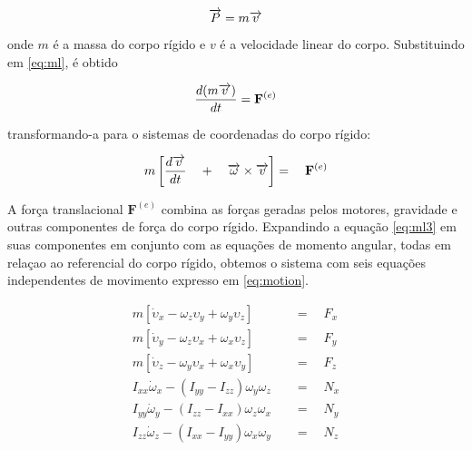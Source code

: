 \documentclass[a4paper, 12pt]{article}
\begin{document}
\begin{equation}
\centering
\overrightarrow { P } = m\overrightarrow { v } 
\label{eq:ml2}
\end{equation}

\noindent onde $m$ é a massa do corpo rígido e $v$ é a velocidade linear do corpo. Substituindo em \ref{eq:ml}, é obtido 

\begin{equation}
\centering
\frac { d(m\overrightarrow { v } ) }{ dt } ={ \mathbf{F} }^{ (e) }
\label{eq:ml3}
\end{equation}

\noindent  transformando-a para o sistemas de coordenadas do corpo rígido:

\begin{equation}
\centering
m\left[ \frac { d\overrightarrow { v }  }{ dt } \quad +\quad \overrightarrow { \omega  } \times \overrightarrow { v }  \right] =\quad { \mathbf{F} }^{ (e) }
\label{eq:ml3}
\end{equation}

\noindent A força translacional $\mathbf{F}^{(e)}$ combina as forças geradas pelos motores, gravidade e outras componentes de força do corpo rígido. Expandindo a equação \ref{eq:ml3} em suas componentes em conjunto com as equações de momento angular, todas em relaçao ao referencial do corpo rígido, obtemos o sistema com seis equações independentes de movimento expresso em \ref{eq:motion}.

\begin{equation}
\begin{aligned}
m\left[ { \dot { \upsilon  }  }_{ x } - { \omega  }_{ z }\upsilon_{ y } + { \omega  }_{ y }{ \upsilon  }_{ z } \right] \quad &=\quad { F }_{ x } \\ 
m\left[ { \dot { \upsilon  }  }_{ y } - { \omega  }_{ z }\upsilon_{ x } + { \omega  }_{ x }{ \upsilon  }_{ z } \right] \quad &=\quad { F }_{ y } \\
m\left[ { \dot { \upsilon  }  }_{ z } - { \omega  }_{ y }\upsilon_{ x } + { \omega  }_{ x }{ \upsilon  }_{ y } \right] \quad &=\quad { F }_{ z } \\ 
{ I }_{ xx }{ \dot { \omega  }  }_{ x } - (I_{ yy } - I_{ zz }){ \omega  }_{ y }{ \omega  }_{ z }\quad &=\quad N_{ x } \\
{ I }_{ yy }{ \dot { \omega  }  }_{ y } - (I_{ zz } - I_{ xx }){ \omega  }_{ z }{ \omega  }_{ x }\quad &=\quad N_{ y }\\
{ I }_{ zz }{ \dot { \omega  }  }_{ z } - (I_{ xx } - I_{ yy }){ \omega  }_{ x }{ \omega  }_{ y }\quad &=\quad N_{ z }
\end{aligned}
\label{eq:motion}
\end{equation}
\end{document}
